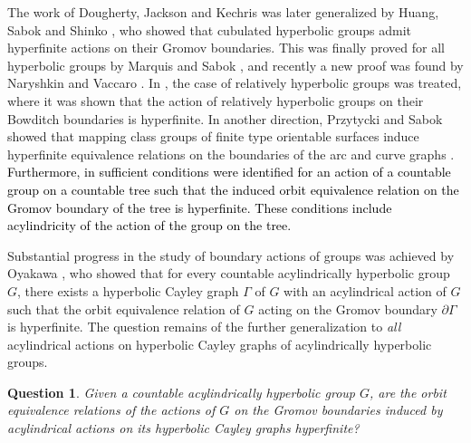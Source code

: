 \documentclass{article}[11pt]
\newtheorem{ques}{Question}
\newcommand{\DO}[1]{{\textcolor{green}{{\bf Damian:}{\small {~#1~}}}}}
\begin{document}
The work of Dougherty, Jackson and Kechris was later generalized 
by Huang, Sabok and Shinko \cite{HSS19}, who showed that cubulated hyperbolic groups admit hyperfinite actions on their Gromov boundaries. This was finally proved for all hyperbolic groups by Marquis and Sabok \cite{MS20}, and recently a new proof was found by Naryshkin and Vaccaro \cite{NaryshVacc}. In \cite{KarRelHyp}, the case of relatively hyperbolic groups was treated, where it was shown that the action of relatively hyperbolic groups on their Bowditch boundaries is hyperfinite. In another direction, Przytycki and Sabok showed that mapping class groups of finite type orientable surfaces induce hyperfinite equivalence relations on the boundaries of the arc and curve graphs \cite{przytycki_sabok_2021}. \textcolor{black}{Furthermore, in \cite{Hyp_Tree_Actions} sufficient conditions were identified for an action of a countable group on a countable tree such that the induced orbit equivalence relation on the Gromov boundary of the tree is hyperfinite. These conditions include acylindricity of the action of the group on the tree.}



Substantial progress in the study of boundary actions of groups was achieved by Oyakawa \cite{MR4715159}, who showed that for every countable acylindrically hyperbolic group $G$, there exists a hyperbolic Cayley graph $\Gamma$ of $G$ with an acylindrical action of $G$ such that the orbit equivalence relation of $G$ acting on the Gromov boundary $\partial \Gamma$ is hyperfinite. 
The question remains of the further generalization to \emph{all} {\color{black}acylindrical actions on hyperbolic Cayley graphs} of acylindrically hyperbolic groups. 

\begin{ques}
    \label{A}
    Given a countable acylindrically hyperbolic group $G$, are the orbit equivalence relations of the actions of $G$ on the Gromov boundaries {\color{black}induced by acylindrical actions on its hyperbolic} Cayley graphs hyperfinite?
\end{ques}
\end{document}
